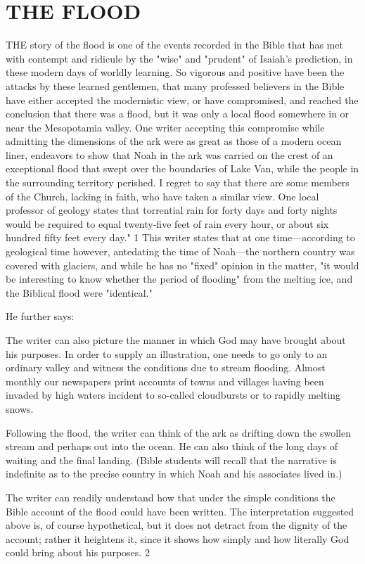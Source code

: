 \chapter{THE FLOOD}

THE story of the flood is one of the events recorded in the Bible that has met with contempt
and ridicule by the "wise" and "prudent" of Isaiah's prediction, in these modern days of
worldly learning. So vigorous and positive have been the attacks by these learned gentlemen,
that many professed believers in the Bible have either accepted the modernistic view, or have
compromised, and reached the conclusion that there was a flood, but it was only a local flood
somewhere in or near the Mesopotamia valley. One writer accepting this compromise while
admitting the dimensions of the ark were as great as those of a modern ocean liner, endeavors
to show that Noah in the ark was carried on the crest of an exceptional flood that swept over
the boundaries of Lake Van, while the people in the surrounding territory perished. I regret to
say that there are some members of the Church, lacking in faith, who have taken a similar
view. One local professor of geology states that torrential rain for forty days and forty nights
would be required to equal twenty-five feet of rain every hour, or about six hundred fifty feet
every day." 1 This writer states that at one time—according to geological time however,
antedating the time of Noah—the northern country was covered with glaciers, and while he
has no "fixed" opinion in the matter, "it would be interesting to know whether the period of
flooding" from the melting ice, and the Biblical flood were "identical."

He further says:

The writer can also picture the manner in which God may have brought about his purposes.
In order to supply an illustration, one needs to go only to an ordinary valley and witness the
conditions due to stream flooding. Almost monthly our newspapers print accounts of towns
and villages having been invaded by high waters incident to so-called cloudbursts or to
rapidly melting snows.

Following the flood, the writer can think of the ark as drifting down the swollen stream and
perhaps out into the ocean. He can also think of the long days of waiting and the final
landing. (Bible students will recall that the narrative is indefinite as to the precise country in
which Noah and his associates lived in.)

The writer can readily understand how that under the simple conditions the Bible account of
the flood could have been written. The interpretation suggested above is, of course
hypothetical, but it does not detract from the dignity of the account; rather it heightens it,
since it shows how simply and how literally God could bring about his purposes. 2

